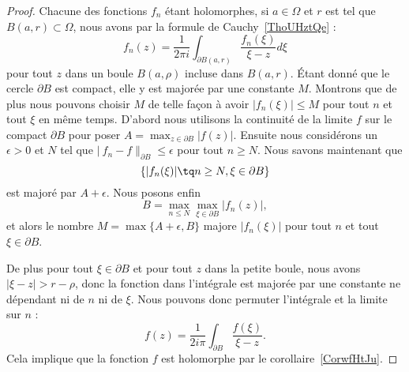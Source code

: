 \begin{proof}
    Chacune des fonctions \( f_n\) étant holomorphes, si \( a\in \Omega\) et \( r\) est tel que \( B(a,r)\subset \Omega\), nous avons par la formule de Cauchy~\ref{ThoUHztQe} :
    \begin{equation}
        f_n(z)=\frac{1}{ 2\pi i }\int_{\partial B(a,r)}\frac{ f_n(\xi) }{ \xi-z }d\xi
    \end{equation}
    pour tout \( z\) dans un boule \( B(a,\rho)\) incluse dans \( B(a,r)\). Étant donné que le cercle \( \partial B\) est compact, elle y est majorée par une constante \( M\). Montrons que de plus nous pouvons choisir \( M\) de telle façon à avoir \( | f_n(\xi) |\leq M\) pour tout \( n\) et tout \( \xi\) en même temps. D'abord nous utilisons la continuité de la limite \( f\) sur le compact \( \partial B \) pour poser \( A=\max_{z\in\partial B}| f(z) |\). Ensuite nous considérons un \( \epsilon>0\) et \( N\) tel que \( |\ f_n-f \|_{\partial B}\leq \epsilon\) pour tout \( n\geq N\). Nous savons maintenant que
    \begin{equation}
        \{ | f_n(\xi) |\tq n \geq N,\xi\in\partial B \}
    \end{equation}
    est majoré par \( A+\epsilon\). Nous posons enfin
    \begin{equation}
        B=\max_{n\leq N}\max_{\xi\in\partial B}| f_n(z) |,
    \end{equation}
    et alors le nombre \( M=\max\{ A+\epsilon,B \}\) majore \( | f_n(\xi) |\) pour tout \( n\) et tout \( \xi\in\partial B\).

    De plus pour tout \( \xi\in\partial B\) et pour tout \( z\) dans la petite boule, nous avons \( | \xi-z |>r-\rho\), donc  la fonction dans l'intégrale est majorée par une constante ne dépendant ni de \( n\) ni de \( \xi\). Nous pouvons donc permuter l'intégrale et la limite sur \( n\) :
    \begin{equation}
        f(z)=\frac{1}{ 2i\pi }\int_{\partial B}\frac{ f(\xi) }{ \xi-z }.
    \end{equation}
    Cela implique que la fonction \( f\) est holomorphe par le corollaire~\ref{CorwfHtJu}.


\end{proof}
